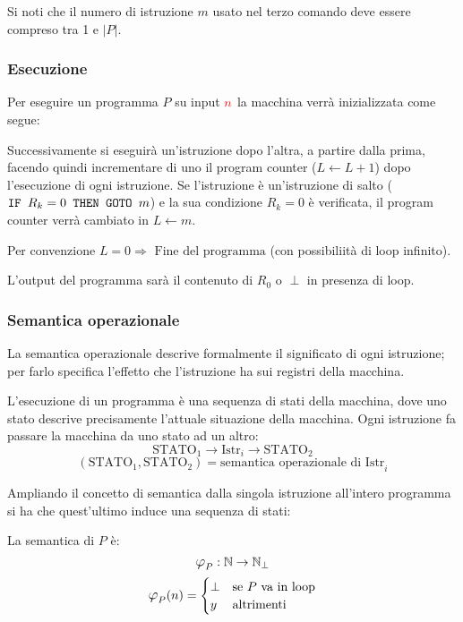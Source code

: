Si noti che il numero di istruzione $m$ usato nel terzo comando deve essere compreso tra
1 e $|P|$.

\subsubsection*{Esecuzione}
Per eseguire un programma $P$ su input $\color{red}n$ la macchina verrà inizializzata come segue:
\begin{figure}[H]
    \centering
    
\end{figure}

Successivamente si eseguirà un'istruzione dopo l'altra, a partire dalla prima, facendo quindi
incrementare di uno il program counter ($L\leftarrow L+1$) dopo l'esecuzione di ogni istruzione.
Se l'istruzione è un'istruzione di salto ($\texttt{IF $R_k=0$ THEN GOTO $m$}$) e la sua condizione $R_k=0$
è verificata, il program counter verrà cambiato in $L\leftarrow m$.

Per convenzione $L=0 \Rightarrow \text{ Fine del programma}$ (con possibiliità di loop infinito).

L'output del programma sarà il contenuto di $R_0$ o $\perp$ in presenza di loop.

\subsubsection*{Semantica operazionale}
La semantica operazionale descrive formalmente il significato di ogni istruzione; per farlo
specifica l'effetto che l'istruzione ha sui registri della macchina.

L'esecuzione di un programma è una sequenza di stati della macchina, dove uno stato descrive
precisamente l'attuale situazione della macchina. Ogni istruzione fa passare la macchina da
uno stato ad un altro:
$$ \text{STATO}_1 \rightarrow \boxed{\text{Istr}_i} \rightarrow \text{STATO}_2 $$
$$ (\text{STATO}_1,\text{STATO}_2) = \text{semantica operazionale di Istr}_i $$

Ampliando il concetto di semantica dalla singola istruzione all'intero programma si ha che 
quest'ultimo induce una sequenza di stati:
\begin{figure}[H]
    \centering
    
\end{figure}

La semantica di $P$ è:
$$ \semanticaRAM_P:\N\to\N_\perp $$
$$ \semanticaRAM_P(n) = \begin{cases}
\perp & \text{se $P$ va in loop}\\
y & \text{altrimenti}
\end{cases} $$


